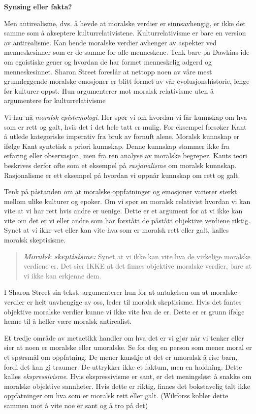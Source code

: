 \documentclass[11pt, a4paper]{article}
\newenvironment{sectionbox}[1][]{%
    \begin{sectionboxinner}
    \textbf{\large #1}
    \vspace{1pt}
    \newline
}{%
    \end{sectionboxinner}
}
\begin{document}
\begin{sectionbox}[Synsing eller fakta?]
\begin{flushleft}
    Men antirealisme, dvs. å hevde at moralske verdier er sinnsavhengig, er ikke det samme som å akseptere kulturrelativistene. Kulturrelativisme er bare en version av antirealisme. Kan hende moralske verdier avhenger av aspekter ved menneskesinner som er de samme for alle menneskene. Tenk bare på Dawkins ide om egoistiske gener og hvordan de har formet menneskelig adgerd og menneskesinnet. Sharon Street foreslår at nettopp noen av våre mest grunnleggende moralske emosjoner er blitt formet av vår evolusjonshistorie, lenge før kulturer oppst. Hun argumenterer mot moralsk relativisme uten å argumentere for kulturrelativisme\newline


    Vi har nå \textit{moralsk epistemologi}. Her spør vi om hvordan vi får kunnskap om hva som er rett og galt, hvis det i det hele tatt er mulig. For eksempel forsøker Kant å utlede kategoriske imperativ fra bruk av fornuft alene. Moralsk kunnskap er ifølge Kant syntetisk a priori kunnskap. Denne kunnskap stammer ikke fra erfaring eller observasjon, men fra ren analyse av moralske begreper. Kants teori beskrives derfor ofte som et eksempel på \textit{rasjonalisme} om moralsk kunnskap. Rasjonalisme er ett eksempel på hvordan vi oppnår kunnskap om rett og galt.\newline

    Tenk på påstanden om at moralske oppfatninger og emosjoner varierer sterkt mellom ulike kulturer og epoker. Om vi spør en moralsk relativist hvordan vi kan vite at vi har rett hvis andre er uenige. Dette er et argument for at vi ikke kan vite om det er vi eller andre som har forstått de påstått objektive verdiene riktig. Synet at vi ikke vet eller kan vite hva som er moralsk rett eller galt, kalles moralsk skeptisisme. 
    \begin{quote}
        \textbf{\textit{Moralsk skeptisisme:}} Synet at vi ikke kan vite hva de virkelige moralske verdiene er. Det sier IKKE at det finnes objektive moralske verdier, bare at vi ikke kan erkjenne dem.
    \end{quote}

    I Sharon Street sin tekst, argumenterer hun for at antakelsen om at moralske verdier er helt uavhengige av oss, leder til moralsk skeptisisme. Hvis det fantes objektive moralske verdier kunne vi ikke vite hva de er. Dette er er grunn ifølge henne til å heller være moralsk antirealist.\newline


    Et tredje område av metaetikk handler om hva det er vi gjør når vi tenker eller sier at noen er moralske eller umoralske. Se for deg en person som mener moral er et spørsmål om oppfatning. De mener kanskje at det er umoralsk å rise barn, fordi det kan gi traumer. De uttrykker ikke et faktum, men en holdning. Dette kalles \textit{ekspressivisme}. Hvis ekspressivisme er sant, er det meningsløst å snakke om moralske objektive sannheter. Hvis dette er riktig, finnes det bokstavelig talt ikke oppfatninger om hva som er moralsk rett eller galt. (Wikforss kobler dette sammen mot å vite noe er sant og å tro på det)\newline


\end{flushleft}
\end{sectionbox}
\end{document}
